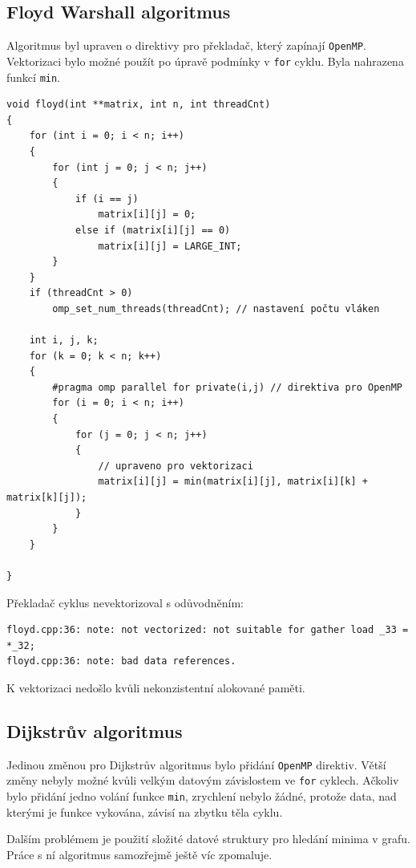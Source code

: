 \documentclass[10pt,a4paper]{article}
\begin{document}
\subsection{Floyd Warshall algoritmus}

Algoritmus byl upraven o direktivy pro překladač, který zapínají \texttt{OpenMP}. Vektorizaci bylo možné použít po úpravě podmínky v \texttt{for} cyklu. Byla nahrazena funkcí \texttt{min}.

\begin{verbatim}
void floyd(int **matrix, int n, int threadCnt)
{
    for (int i = 0; i < n; i++)
    {
        for (int j = 0; j < n; j++)
        {
            if (i == j)
                matrix[i][j] = 0;
            else if (matrix[i][j] == 0)
                matrix[i][j] = LARGE_INT;
        }
    }
    if (threadCnt > 0)
        omp_set_num_threads(threadCnt); // nastavení počtu vláken

    int i, j, k;
    for (k = 0; k < n; k++)
    {
        #pragma omp parallel for private(i,j) // direktiva pro OpenMP
        for (i = 0; i < n; i++)
        {
            for (j = 0; j < n; j++)
            {
                // upraveno pro vektorizaci
                matrix[i][j] = min(matrix[i][j], matrix[i][k] + matrix[k][j]);
            }
        }
    }

}
\end{verbatim}

Překladač cyklus nevektorizoval s odůvodněním:

\begin{verbatim}
floyd.cpp:36: note: not vectorized: not suitable for gather load _33 = *_32;
floyd.cpp:36: note: bad data references.
\end{verbatim}

K vektorizaci nedošlo kvůli nekonzistentní alokované paměti.

\subsection{Dijkstrův algoritmus}

Jedinou změnou pro Dijkstrův algoritmus bylo přidání \texttt{OpenMP} direktiv. Větší změny nebyly možné kvůli velkým datovým závislostem ve \texttt{for} cyklech. Ačkoliv bylo přidání jedno volání funkce \texttt{min}, zrychlení nebylo žádné, protože data, nad kterými je funkce vykována, závisí na zbytku těla cyklu.

Dalším problémem je použití složité datové struktury pro hledání minima v grafu. Práce s ní algoritmus samozřejmě ještě víc zpomaluje.
\end{document}

